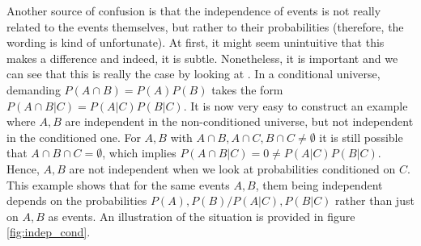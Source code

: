 Another source of confusion is that the independence of events is not really related to the events themselves, but rather to their probabilities (therefore, the wording is kind of unfortunate). At first, it might seem unintuitive that this makes a difference and indeed, it is subtle. Nonetheless, it is important and we can see that this is really the case by looking at . In a conditional universe, demanding $P(A \cap B) = P(A) P(B)$ takes the form $P(A \cap B | C) = P(A | C) P(B | C)$. It is now very easy to construct an example where $A, B$ are independent in the non-conditioned universe, but not independent in the conditioned one. For $A, B$ with $A \cap B, A \cap C, B \cap C \neq \emptyset$ it is still possible that $A \cap B \cap C = \emptyset$, which implies $P(A \cap B | C) = 0 \neq P(A | C) P(B | C)$. Hence, $A, B$ are not independent when we look at probabilities conditioned on $C$. This example shows that for the same events $A, B$, them being independent depends on the probabilities $P(A), P(B) / P(A | C), P(B | C)$ rather than just on $A, B$ as events. An illustration of the situation is provided in figure \ref{fig:indep_cond}.



